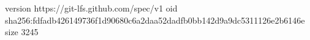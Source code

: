 version https://git-lfs.github.com/spec/v1
oid sha256:fdfadb426149736f1d90680c6a2daa52dadfb0bb142d9a9dc5311126e2b6146e
size 3245
